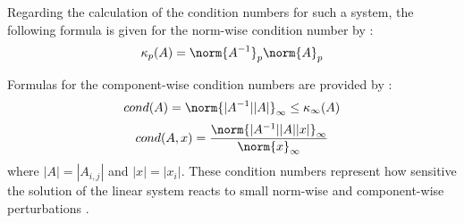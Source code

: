 \noindent Regarding the calculation of the condition numbers for such a system, the following formula is given for the norm-wise condition number by \cite{higham_accuracy_2002}:
\begin{equation}
\kappa_{p}(A) = \norm{A^{-1}}_p\norm{A}_p
\end{equation}

\noindent Formulas for the component-wise condition numbers are provided by \cite{skeel_scaling_1979}:
\begin{equation}
cond(A) = \norm{|A^{-1}||A|}_\infty \leq \kappa_{\infty}(A)
\end{equation}
\begin{equation}
cond(A,x) = \frac{\norm{|A^{-1}||A||x|}_\infty}{\norm{x}_\infty}
\end{equation}
\noindent where $|A| = |A_{i,j}|$ and $|x| = |x_{i}|$. These condition numbers represent how sensitive the solution of the linear system reacts to small norm-wise and component-wise perturbations \cite{higham_accuracy_2002}. 